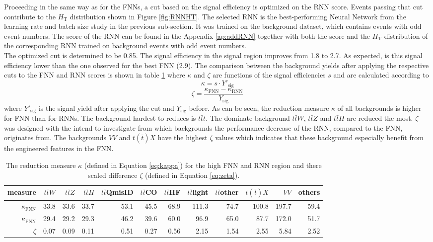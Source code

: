 Proceeding in the same way as for the FNNs, a cut based on the signal efficiency is optimized on the RNN score. Events passing that cut contribute to the $H_{\text{T}}$ distribution shown in Figure \ref{fig:RNNHT}. The selected RNN is the best-performing Neural Network from the learning rate and batch size study in the previous sub-section. It was trained on the background dataset, which contains events with odd event numbers. The score of the RNN can be found in the Appendix \ref{ap:addRNN} together with both the score and the $H_{\text{T}}$ distribution of the corresponding RNN trained on background events with odd event numbers. \\
The optimized cut is determined to be 0.85. The signal efficiency in the signal region improves from 1.8 to 2.7. As expected, is this signal efficiency lower than the one observed for the best FNN (2.9). The comparison between the background yields after applying the respective cuts to the FNN and RNN scores is shown in table \ref{tab:Rejcomb} where $\kappa$ and $\zeta$ are functions of the signal efficiencies $s$ and are calculated according to
\begin{equation}
\kappa = s \cdot Y'_{\text{sig}} 
\label{eq:kappa}
\end{equation}
\begin{equation}
\zeta = \frac{\kappa_{\text{FNN}} - \kappa_{\text{RNN}}}{Y_{\text{sig}}}
\label{eq:zeta}
\end{equation}
where $Y'_{\text{sig}}$ is the signal yield after applying the cut and $Y_{\text{sig}}$ before. As can be seen, the reduction measure $\kappa$ of all backgrounds is higher for FNN than for RNNs. The background hardest to reduces is $t\bar{t}t$. The dominate background $t\bar{t}W$, $t\bar{t}Z$ and $t\bar{t}H$ are reduced the most. $\zeta$ was designed with the intend to investigate from which backgrounds the performance decrease of the RNN, compared to the FNN, originates from. The backgrounds $VV$ and $t(\bar{t})X$ have the highest $\zeta$ values which indicates that these background especially benefit from the engineered features in the FNN. 

\begin{table}[H]
\begin{tabular}{|r|r|r|r|r|r|r|r|r|r|r|r|}
\toprule
measure & $t\bar{t}W$ & $t\bar{t}Z$ & $t\bar{t}H$ & $t\bar{t}$QmisID & $t\bar{t}$CO & $t\bar{t}$HF & $t\bar{t}$light & $t\bar{t}$other & $t(\bar{t})X$ & $VV$ & others \\
\midrule
\midrule
$\kappa_{\text{FNN}}$ & 33.8 & 33.6 & 33.7 & 53.1 & 45.5 & 68.9 & 111.3 & 74.7 & 100.8 & 197.7 & 59.4 \\
$\kappa_{\text{FNN}}$ & 29.4 & 29.2 & 29.3 & 46.2 & 39.6 & 60.0 & 96.9 & 65.0 & 87.7 & 172.0 & 51.7 \\
$\zeta$ & 0.07 & 0.09 & 0.11 & 0.51 & 0.27 & 0.56 & 2.15 & 1.54 & 2.55 & 5.84 & 2.52 \\
\bottomrule
\end{tabular}
\caption{The reduction measure $\kappa$ (defined in Equation \ref{eq:kappa}) for the high FNN and RNN region and there scaled difference $\zeta$ (defined in Equation \ref{eq:zeta}).}
\label{tab:Rejcomb}
\end{table}

